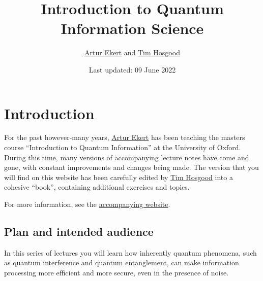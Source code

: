 \documentclass[fleqn]{article}
\title{Introduction to Quantum Information Science}
\author{\href{https://www.arturekert.org/}{Artur Ekert} and \href{https://thosgood.com}{Tim Hosgood}}
\date{Last updated: 09 June 2022}
\renewcommand{\leq}{\leqslant}
\renewcommand{\geq}{\geqslant}
\let\oldsection\section
\renewcommand\section{\clearpage\oldsection}
\begin{document}
\setcounter{tocdepth}{2}
\maketitle

\hypertarget{introduction}{%
\section*{Introduction}\label{introduction}}

\providecommand{\xmapsto}[1]{\overset{#1}{\longmapsto}}
\providecommand{\bra}[1]{\langle#1|}
\providecommand{\ket}[1]{|#1\rangle}
\providecommand{\braket}[2]{\langle#1|#2\rangle}
\providecommand{\proj}[1]{|#1\rangle\langle#1|}
\providecommand{\av}[1]{\langle#1\rangle}
\providecommand{\tr}{\operatorname{tr}}
\providecommand{\id}{\mathbf{1}}
\providecommand{\diag}[2]{\begin{bmatrix}#1&0\\0&#2\end{bmatrix}}
\providecommand{\mqty}[1]{\begin{matrix}#1\end{matrix}}
\providecommand{\bmqty}[1]{\begin{bmatrix}#1\end{bmatrix}}
\renewcommand{\leq}{\leqslant}
\renewcommand{\geq}{\geqslant}

For the past however-many years, \href{https://www.arturekert.com/}{Artur Ekert} has been teaching the masters course ``Introduction to Quantum Information'' at the University of Oxford.
During this time, many versions of accompanying lecture notes have come and gone, with constant improvements and changes being made.
The version that you will find on this website has been carefully edited by \href{https://thosgood.com}{Tim Hosgood} into a cohesive ``book'', containing additional exercises and topics.

For more information, see the \href{https://arturekert.org/iqis}{accompanying website}.

\hypertarget{plan-and-intended-audience}{%
\subsection*{Plan and intended audience}\label{plan-and-intended-audience}}

In this series of lectures you will learn how inherently quantum phenomena, such as quantum interference and quantum entanglement, can make information processing more efficient and more secure, even in the presence of noise.
\end{document}
